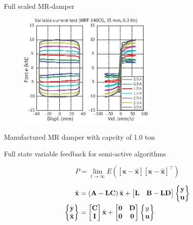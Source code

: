 \documentclass[usepdftitle=false]{beamer}
\newenvironment{psmatrix}
  {\left\{\begin{matrix}}
  {\end{matrix}\right\}}
\begin{document}
\begin{frame}{Full scaled MR-damper}
\begin{figure}[!ht]
\centering
\includegraphics[width=0.6\textwidth] {figure/n3-6c.eps}
   \label{fig:n3-6c}

\label{fig:n3-6}
\end{figure}
Manufactured MR damper with capcity of 1.0 ton
\end{frame}



\begin{frame}{Full state variable feedback for semi-active algorithms}

\begin{equation}\label{eq:n3-13}
P = \lim_{t\to\infty} E\left(\left[ \mathbf{x} - \hat{\mathbf{x}} \right] \left[ \mathbf{x} - \hat{\mathbf{x}} \right]^{\top}\right)
\end{equation}

\begin{equation}\label{eq:n3-14}
\begin{aligned}
\hat{\mathbf{x}} &= \left(\mathbf{A}-\mathbf{LC}\right)\hat{\mathbf{x}} + \begin{bmatrix}\mathbf{L} & \mathbf{B}-\mathbf{LD}\end{bmatrix} \begin{psmatrix}\mathbf{y}\\\mathbf{u}\end{psmatrix} \\
\begin{psmatrix}\hat{\mathbf{y}}\\\hat{\mathbf{x}}\end{psmatrix} & = \begin{bmatrix}\mathbf{C} \\ \mathbf{I}\end{bmatrix}\hat{\mathbf{x}} + \begin{bmatrix}\mathbf{0} & \mathbf{D}\\ \mathbf{0} & \mathbf{0}\end{bmatrix}\begin{psmatrix}y \\ \mathbf{u}\end{psmatrix}
\end{aligned}
\end{equation}

\end{frame}
\end{document}

